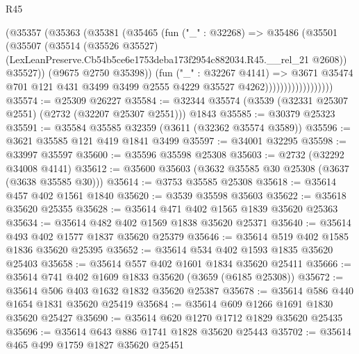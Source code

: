 \begin{lexlean}{R45}
\begin{coremodule}
                              (@35357
                                (@35363
                                  (@35381
                                    (@35465
                                      (fun ("_" : @32268) =>
                                      @35486
                                        (@35501
                                          (@35507
                                            (@35514
                                              (@35526 @35527)
                                              (LexLeanPreserve.Cb54b5ce6e1753deba173f2954c882034.R45.__rel_21
                                                @2608))
                                            @35527))
                                        (@9675 @2750 @35398))
                                      (fun ("_" : @32267 @4141) =>
                                      @3671
                                        @35474
                                        @701
                                        @121
                                        @431
                                        @3499
                                        @3499
                                        @2555
                                        @4229
                                        @35527
                                        @4262))))))))))))))))))
@35574 := @25309 @26227
@35584 := @32344 @35574 (@3539 (@32331 @25307 @2551) (@2732 (@32207 @25307 @2551))) @1843
@35585 := @30379 @25323
@35591 := @35584 @35585 @32359 (@3611 (@32362 @35574 @3589))
@35596 := @3621 @35585 @121 @419 @1841 @3499
@35597 := @34001 @32295
@35598 := @33997 @35597
@35600 := @35596 @35598 @25308
@35603 := @2732 (@32292 @34008 @4141)
@35612 := @35600 @35603 (@3632 @35585 @30 @25308 (@3637 (@3638 @35585 @30)))
@35614 := @3753 @35585 @25308
@35618 := @35614 @457 @402 @1561 @1840
@35620 := @3539 @35598 @35603
@35622 := @35618 @35620 @25355
@35628 := @35614 @471 @402 @1565 @1839 @35620 @25363
@35634 := @35614 @482 @402 @1569 @1838 @35620 @25371
@35640 := @35614 @493 @402 @1577 @1837 @35620 @25379
@35646 := @35614 @519 @402 @1585 @1836 @35620 @25395
@35652 := @35614 @534 @402 @1593 @1835 @35620 @25403
@35658 := @35614 @557 @402 @1601 @1834 @35620 @25411
@35666 := @35614 @741 @402 @1609 @1833 @35620 (@3659 (@6185 @25308))
@35672 := @35614 @506 @403 @1632 @1832 @35620 @25387
@35678 := @35614 @586 @440 @1654 @1831 @35620 @25419
@35684 := @35614 @609 @1266 @1691 @1830 @35620 @25427
@35690 := @35614 @620 @1270 @1712 @1829 @35620 @25435
@35696 := @35614 @643 @886 @1741 @1828 @35620 @25443
@35702 := @35614 @465 @499 @1759 @1827 @35620 @25451

\end{coremodule}
\end{lexlean}
